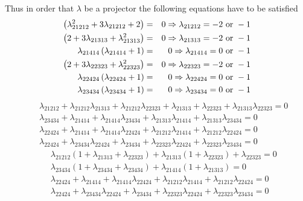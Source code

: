\documentclass[12pt]{article}
\begin{document}
\bigskip Thus in order that $\lambda $ be a projector the following
equations have to be satisfied%
\begin{eqnarray}
\left( \lambda _{21212}^{2}+3\lambda _{21212}+2\right) &=&0\Rightarrow
\lambda _{21212}=-2\text{ or }-1  \notag \\
\left( 2+3\lambda _{21313}+\lambda _{21313}^{2}\right) &=&0\Rightarrow
\lambda _{21313}=-2\text{ or }-1  \notag \\
\lambda _{21414}\left( \lambda _{21414}+1\right) &=&0\Rightarrow \lambda
_{21414}=0\text{ or }-1  \notag \\
\left( 2+3\lambda _{22323}+\lambda _{22323}^{2}\right) &=&0\Rightarrow
\lambda _{22323}=-2\text{ or }-1  \notag \\
\lambda _{22424}\left( \lambda _{22424}+1\right) &=&0\Rightarrow \lambda
_{22424}=0\text{ or }-1  \notag \\
\lambda _{23434}\left( \lambda _{23434}+1\right) &=&0\Rightarrow \lambda
_{23434}=0\text{ or }-1
\end{eqnarray}%
\begin{eqnarray*}
&&\lambda _{21212}+\lambda _{21212}\lambda _{21313}+\lambda _{21212}\lambda
_{22323}+\lambda _{21313}+\lambda _{22323}+\lambda _{21313}\lambda _{22323}=0
\\
&&\lambda _{23434}+\lambda _{21414}+\lambda _{21414}\lambda _{23434}+\lambda
_{21313}\lambda _{21414}+\lambda _{21313}\lambda _{23434}=0 \\
&&\lambda _{22424}+\lambda _{21414}+\lambda _{21414}\lambda _{22424}+\lambda
_{21212}\lambda _{21414}+\lambda _{21212}\lambda _{22424}=0 \\
&&\lambda _{22424}+\lambda _{23434}\lambda _{22424}+\lambda _{23434}+\lambda
_{22323}\lambda _{22424}+\lambda _{22323}\lambda _{23434}=0
\end{eqnarray*}%
\begin{eqnarray*}
&&\lambda _{21212}\left( 1+\lambda _{21313}+\lambda _{22323}\right) +\lambda
_{21313}\left( 1+\lambda _{22323}\right) +\lambda _{22323}=0 \\
&&\lambda _{23434}\left( 1+\lambda _{23434}+\lambda _{23434}\right) +\lambda
_{21414}\left( 1+\lambda _{21313}\right) =0 \\
&&\lambda _{22424}+\lambda _{21414}+\lambda _{21414}\lambda _{22424}+\lambda
_{21212}\lambda _{21414}+\lambda _{21212}\lambda _{22424}=0 \\
&&\lambda _{22424}+\lambda _{23434}\lambda _{22424}+\lambda _{23434}+\lambda
_{22323}\lambda _{22424}+\lambda _{22323}\lambda _{23434}=0
\end{eqnarray*}%
\end{document}
